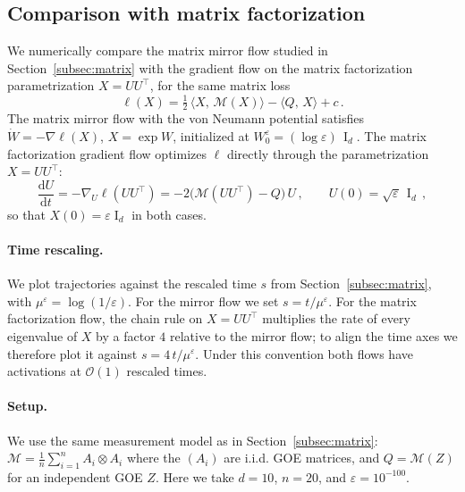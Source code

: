 \documentclass[11pt,english,reqno]{article}
\DeclareMathOperator{\I}{I}
\newcommand{\diff}{\mathrm{d}}
\theoremstyle{plain}
\theoremstyle{definition}
\theoremstyle{remark}
\numberwithin{equation}{section}
\begin{document}
\subsection{Comparison with matrix factorization}
\label{app:MMcomp}

We numerically compare the matrix mirror flow studied in Section~\ref{subsec:matrix}
with the gradient flow on the matrix factorization parametrization $X = U U^\top$,
for the same matrix loss
\[
  \ell(X) = \tfrac{1}{2}\,\langle X,\,\mathcal{M}(X) \rangle
            - \langle Q,\,X \rangle + c \, .
\]
The matrix mirror flow with the von Neumann potential satisfies
$\dot W = -\nabla \ell(X)$, $X = \exp W$, initialized at
$W^\varepsilon_0 = (\log \varepsilon)\,\I_d$.
The matrix factorization gradient flow optimizes $\ell$ directly through the
parametrization $X = U U^\top$:
\[
  \frac{\diff U}{\diff t} = - \nabla_U \ell(U U^\top)
    = -2 \big(\mathcal{M}(U U^\top) - Q\big)\, U \, ,
    \qquad U(0) = \sqrt{\varepsilon}\, \I_d \, ,
\]
so that $X(0) = \varepsilon \I_d$ in both cases.

\paragraph{Time rescaling.}
We plot trajectories against the rescaled time $s$ from
Section~\ref{subsec:matrix}, with $\mu^\varepsilon = \log(1/\varepsilon)$.
For the mirror flow we set $s = t/\mu^\varepsilon$. For the matrix
factorization flow, the chain rule on $X = U U^\top$ multiplies the rate
of every eigenvalue of $X$ by a factor $4$ relative to the mirror flow; to align the time axes we therefore plot
it against $s = 4\, t / \mu^\varepsilon$. Under this convention both flows
have activations at $\mathcal{O}(1)$ rescaled times.

\paragraph{Setup.}
We use the same measurement model as in Section~\ref{subsec:matrix}:
$\mathcal{M} = \tfrac{1}{n} \sum_{i=1}^n A_i \otimes A_i$ where the $(A_i)$
are i.i.d. GOE matrices, and $Q = \mathcal{M}(Z)$ for an independent GOE $Z$.
Here we take $d = 10$, $n = 20$, and $\varepsilon = 10^{-100}$.
\end{document}
